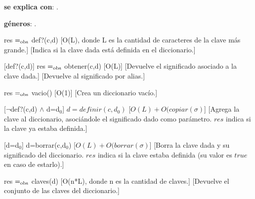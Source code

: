 \begin{Interfaz}
  
  
  \textbf{se explica con}: .
  
  \textbf{g\'eneros}: .


  {res $=_{\mathrm{obs}}$ def?(c,d)}
  [O(L), donde L es la cantidad de caracteres de la clave m\'as grande.]
  [Indica si la clave dada est\'a definida en el diccionario.]

  [def?(c,d)]
  {res $=_{\mathrm{obs}}$ obtener(c,d)}
  [O(L)]
  [Devuelve el significado asociado a la clave dada.]
  [Devuelve al significado por alias.]
  
  {res $=_{\mathrm{obs}}$ vacio()}
  [O(1)]
  [Crea un diccionario vac\'io.]
  
  [$\neg$def?(c,d) $\wedge$ d=d$_0$]
  {$d = definir(c,d_0)$}
  [$O(L)+O(copiar(\sigma)$]
  [Agrega la clave al diccionario, asoci\'andole el significado dado como par\'ametro. $res$ indica si la clave ya estaba definida.]
  
  [d=d$_0$]
  {d=borrar(c,d$_0$)}
  [$O(L)+O(borrar(\sigma)$]
  [Borra la clave dada y su significado del diccionario. $res$ indica si la clave estaba definida (su valor es $true$ en caso de estarlo).]
  
  {res $=_{\mathrm{obs}}$ claves(d)}
  [O(n*L), donde n es la cantidad de claves.]
  [Devuelve el conjunto de las claves del diccionario.] 


\end{Interfaz}
